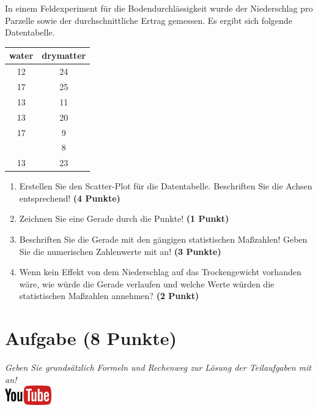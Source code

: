 \documentclass[a4paper, 9pt]{scrartcl}\usepackage[]{graphicx}\usepackage[]{xcolor}
\begin{document}
In einem Feldexperiment f{\"u}r die Bodendurchl{\"a}ssigkeit wurde der Niederschlag
pro Parzelle sowie der durchschnittliche Ertrag gemessen. Es ergibt sich
folgende Datentabelle. 

\begin{table}[!h]
\centering
\begin{tabular}{cc}
\toprule
water & drymatter\\
\midrule
12 & 24\\
17 & 25\\
13 & 11\\
13 & 20\\
17 & 9\\
\addlinespace
17 & 8\\
13 & 23\\
\bottomrule
\end{tabular}
\end{table}



\begin{enumerate}
\item Erstellen Sie den Scatter-Plot f{\"u}r die Datentabelle. Beschriften Sie
  die Achsen entsprechend! \textbf{(4 Punkte)}
\item Zeichnen Sie eine Gerade durch die Punkte! \textbf{(1 Punkt)}
\item Beschriften Sie die Gerade mit den g{\"a}ngigen statistischen Ma{\ss}zahlen!
  Geben Sie die numerischen Zahlenwerte mit an! \textbf{(3 Punkte)}
\item Wenn kein Effekt von dem Niederschlag auf das Trockengewicht
  vorhanden w{\"a}re, wie w{\"u}rde die Gerade verlaufen und welche Werte w{\"u}rden die
  statistischen Ma{\ss}zahlen annehmen? \textbf{(2 Punkt)}
\end{enumerate} 
\clearpage

\section{Aufgabe \hfill (8 Punkte)}

\textit{Geben Sie grunds{\"a}tzlich Formeln und Rechenweg zur L{\"o}sung der
  Teilaufgaben mit an!} \\[1Ex]

\hfill\href{https://youtu.be/t_1KL77mfmg}{\includegraphics[width =
  2cm]{img/youtube}}\\[1Ex]
\end{document}
